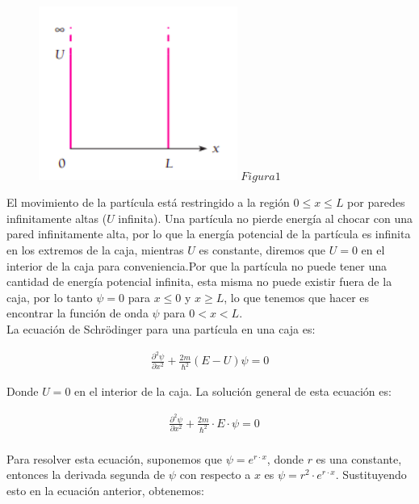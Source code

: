 \documentclass[a4paper]{article}
\begin{document}
        \begin{figure}[h!]
            \centering
            \includegraphics[width=6.5cm]{../../imagenes/pozo_potencial_infinito.png}
            \vspace{-0.5mm}
            \textbf{$Figura 1$} 
        \end{figure}
        
        \saltoPag

        \indent El movimiento de la partícula está restringido a la región $0 \leq x \leq L$ por paredes infinitamente altas ($U$ infinita). Una partícula no pierde energía al chocar con una pared infinitamente alta, por lo que la energía potencial de la partícula es infinita en los extremos de la caja, mientras $U$ es constante, diremos que $ U = 0 $ en el interior de la caja para conveniencia.Por que la partícula no puede tener una cantidad de energía potencial infinita, esta misma no puede existir fuera de la caja, por lo tanto $ \psi = 0$ para $x \leq 0$ y $x \geq L$, lo que tenemos que hacer es encontrar la función de onda $\psi$ para $0 < x < L$.\\
        \indent La ecuación de Schrödinger para una partícula en una caja es:

        \begin{align*}
            \frac{\partial^2 \psi}  {\partial x^2 }+ \frac{2m}{\hbar^2} (E - U) \psi = 0
        \end{align*}

        \indent Donde $U = 0$ en el interior de la caja. La solución general de esta ecuación es:

        \begin{align*}
            &\frac{\partial^2 \psi} {\partial x^2} + \frac{2m}{\hbar^2} \cdot E \cdot \psi = 0 \\
        \end{align*}

        \indent Para resolver esta ecuación, suponemos que $\psi = e^{r \cdot x}$, donde $r$ es una constante, entonces la derivada segunda de $\psi$ con respecto a $x$ es $\psi = r^2 \cdot e^{r \cdot x}$. Sustituyendo esto en la ecuación anterior, obtenemos:
\end{document}
